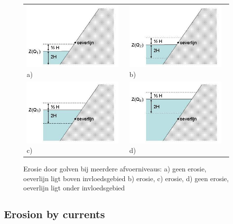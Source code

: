 \begin{figure}
\begin{tabular}{p{6cm}p{6cm}}
\includegraphics[width=5cm]{figures/Fig4-6a.png} \linebreak
a) &
\includegraphics[width=5cm]{figures/Fig4-6b.png} \linebreak
b) \\
\includegraphics[width=5cm]{figures/Fig4-6c.png} \linebreak
c) &
\includegraphics[width=5cm]{figures/Fig4-6d.png} \linebreak
d) \\
\end{tabular}
\caption{Erosie door golven bij meerdere afvoerniveaus: a) geen erosie, oeverlijn ligt boven invloedsgebied b) erosie, c) erosie, d) geen erosie, oeverlijn ligt onder invloedsgebied}
\label{Fig4.6}
\end{figure}

\subsection{Erosion by currents}

